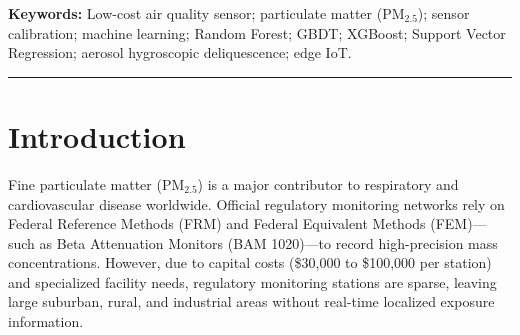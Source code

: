 \documentclass[11pt,a4paper]{article}
\begin{document}
\vspace{0.5em}
\noindent \textbf{Keywords:} Low-cost air quality sensor; particulate matter ($\text{PM}_{2.5}$); sensor calibration; machine learning; Random Forest; GBDT; XGBoost; Support Vector Regression; aerosol hygroscopic deliquescence; edge IoT.
\vspace{1.0em}
\rule{\textwidth}{0.4pt}

\section{Introduction}
Fine particulate matter ($\text{PM}_{2.5}$) is a major contributor to respiratory and cardiovascular disease worldwide. Official regulatory monitoring networks rely on Federal Reference Methods (FRM) and Federal Equivalent Methods (FEM)---such as Beta Attenuation Monitors (BAM 1020)---to record high-precision mass concentrations. However, due to capital costs (\$30,000 to \$100,000 per station) and specialized facility needs, regulatory monitoring stations are sparse, leaving large suburban, rural, and industrial areas without real-time localized exposure information.
\end{document}
